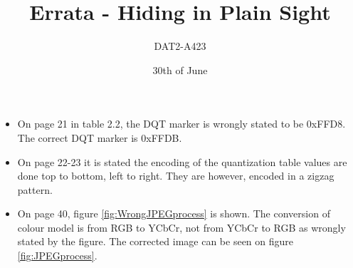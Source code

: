 %
%
%
%
% 
\usepackage{pdfpages}

\title{Errata - Hiding in Plain Sight}
\author{DAT2-A423}
\date{30th of June}
\maketitle
\begin{itemize}
\item On page 21 in table 2.2, the DQT marker is wrongly stated to be 0xFFD8. The correct DQT marker is 0xFFDB.

\item On page 22-23 it is stated the encoding of the quantization table values are done top to bottom, left to right. They are however, encoded in a zigzag pattern. 

\item On page 40, figure \ref{fig:WrongJPEGprocess} is shown. The conversion of colour model is from RGB to YCbCr, not from YCbCr to RGB as wrongly stated by the figure. The corrected image can be seen on figure \ref{fig:JPEGprocess}.
\end{itemize}

